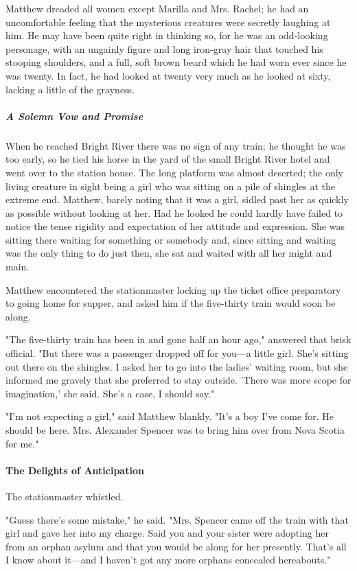 \documentclass{article}
\begin{document}
Matthew dreaded all women except Marilla and Mrs. Rachel; he had an uncomfortable feeling that the mysterious creatures were secretly laughing at him. He may have been quite right in thinking so, for he was an odd-looking personage, with an ungainly figure and long iron-gray hair that touched his stooping shoulders, and a full, soft brown beard which he had worn ever since he was twenty. In fact, he had looked at twenty very much as he looked at sixty, lacking a little of the grayness.

\subparagraph{A Solemn Vow and Promise}
When he reached Bright River there was no sign of any train; he thought he was too early, so he tied his horse in the yard of the small Bright River hotel and went over to the station house. The long platform was almost deserted; the only living creature in sight being a girl who was sitting on a pile of shingles at the extreme end. Matthew, barely noting that it was a girl, sidled past her as quickly as possible without looking at her. Had he looked he could hardly have failed to notice the tense rigidity and expectation of her attitude and expression. She was sitting there waiting for something or somebody and, since sitting and waiting was the only thing to do just then, she sat and waited with all her might and main.

Matthew encountered the stationmaster locking up the ticket office preparatory to going home for supper, and asked him if the five-thirty train would soon be along.

"The five-thirty train has been in and gone half an hour ago," answered that brisk official. "But there was a passenger dropped off for you---a little girl. She's sitting out there on the shingles. I asked her to go into the ladies' waiting room, but she informed me gravely that she preferred to stay outside. 'There was more scope for imagination,' she said. She's a case, I should say."

"I'm not expecting a girl," said Matthew blankly. "It's a boy I've come for. He should be here. Mrs. Alexander Spencer was to bring him over from Nova Scotia for me."

\paragraph{The Delights of Anticipation}
The stationmaster whistled.

"Guess there's some mistake," he said. "Mrs. Spencer came off the train with that girl and gave her into my charge. Said you and your sister were adopting her from an orphan asylum and that you would be along for her presently. That's all I know about it---and I haven't got any more orphans concealed hereabouts."
\end{document}
